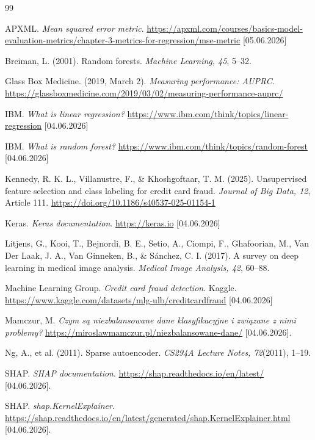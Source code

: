 \documentclass [runningheads]{llncs}
\begin{document}
\begin{thebibliography}{99}

APXML. 
\textit{Mean squared error metric}.
\url{https://apxml.com/courses/basics-model-evaluation-metrics/chapter-3-metrics-for-regression/mse-metric} [05.06.2026]

Breiman, L. (2001).
Random forests.
\textit{Machine Learning, 45}, 5--32.

Glass Box Medicine. (2019, March 2).
\textit{Measuring performance: AUPRC}.
\url{https://glassboxmedicine.com/2019/03/02/measuring-performance-auprc/}

IBM. 
\textit{What is linear regression?}
\url{https://www.ibm.com/think/topics/linear-regression} [04.06.2026]

IBM. 
\textit{What is random forest?}
\url{https://www.ibm.com/think/topics/random-forest} [04.06.2026]

Kennedy, R. K. L., Villanustre, F., \& Khoshgoftaar, T. M. (2025).
Unsupervised feature selection and class labeling for credit card fraud.
\textit{Journal of Big Data, 12}, Article 111.
\url{https://doi.org/10.1186/s40537-025-01154-1}

Keras. 
\textit{Keras documentation}.
\url{https://keras.io} [04.06.2026]

Litjens, G., Kooi, T., Bejnordi, B. E., Setio, A., Ciompi, F.,
Ghafoorian, M., Van Der Laak, J. A., Van Ginneken, B., \& Sánchez, C. I. (2017).
A survey on deep learning in medical image analysis.
\textit{Medical Image Analysis, 42}, 60--88.

Machine Learning Group. 
\textit{Credit card fraud detection}.
Kaggle.
\url{https://www.kaggle.com/datasets/mlg-ulb/creditcardfraud} [04.06.2026]

Mamczur, M.
\textit{Czym są niezbalansowane dane klasyfikacyjne i związane z nimi problemy?}
\url{https://miroslawmamczur.pl/niezbalansowane-dane/} [04.06.2026].

Ng, A., et al. (2011).
Sparse autoencoder.
\textit{CS294A Lecture Notes, 72}(2011), 1--19.

SHAP. 
\textit{SHAP documentation}.
\url{https://shap.readthedocs.io/en/latest/} [04.06.2026].

SHAP. 
\textit{shap.KernelExplainer}.
\url{https://shap.readthedocs.io/en/latest/generated/shap.KernelExplainer.html} [04.06.2026].


\end{thebibliography}
\end{document}
